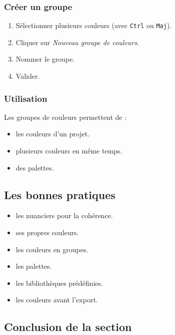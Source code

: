 \subsubsection{Créer un groupe}

\begin{enumerate}
    \item Sélectionner plusieurs couleurs (avec \texttt{Ctrl} ou \texttt{Maj}).
    \item Cliquer sur \emph{Nouveau groupe de couleurs}.
    \item Nommer le groupe.
    \item Valider.
\end{enumerate}

\subsubsection{Utilisation}

Les groupes de couleurs permettent de :

\begin{itemize}
    \item {} les couleurs d'un projet.
    \item {} plusieurs couleurs en même temps.
    \item {} des palettes.
\end{itemize}

\subsection{Les bonnes pratiques}

\begin{itemize}
    \item {} les nuanciers pour la cohérence.
    \item {} ses propres couleurs.
    \item {} les couleurs en groupes.
    \item {} les palettes.
    \item {} les bibliothèques prédéfinies.
    \item {} les couleurs avant l'export.
\end{itemize}

\subsection*{Conclusion de la section}

